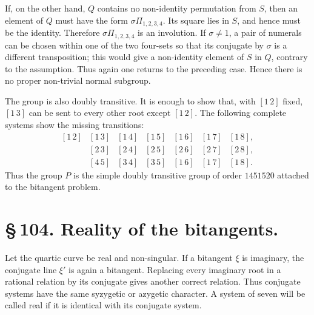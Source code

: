 \documentclass[11pt]{article}
\providecommand{\pair}[2]{[#1\,#2]}
\begin{document}
If, on the other hand, \(Q\) contains no non-identity permutation from \(S\), then an element of \(Q\) must have the form \(\sigma\Pi_{1,2,3,4}\). Its square lies in \(S\), and hence must be the identity. Therefore \(\sigma\Pi_{1,2,3,4}\) is an involution. If \(\sigma\ne1\), a pair of numerals can be chosen within one of the two four-sets so that its conjugate by \(\sigma\) is a different transposition; this would give a non-identity element of \(S\) in \(Q\), contrary to the assumption. Thus again one returns to the preceding case. Hence there is no proper non-trivial normal subgroup.

The group is also doubly transitive. It is enough to show that, with \(\pair{1}{2}\) fixed, \(\pair{1}{3}\) can be sent to every other root except \(\pair{1}{2}\). The following complete systems show the missing transitions:
\[
\begin{array}{lllllll}
\pair{1}{2}&\pair{1}{3}&\pair{1}{4}&\pair{1}{5}&\pair{1}{6}&\pair{1}{7}&\pair{1}{8},\\
\pair{1}{2}&\pair{2}{3}&\pair{2}{4}&\pair{2}{5}&\pair{2}{6}&\pair{2}{7}&\pair{2}{8},\\
\pair{1}{2}&\pair{4}{5}&\pair{3}{4}&\pair{3}{5}&\pair{1}{6}&\pair{1}{7}&\pair{1}{8}.
\end{array}
\]
Thus the group \(P\) is the simple doubly transitive group of order \(1451520\) attached to the bitangent problem.

\section*{\S\,104. Reality of the bitangents.}

Let the quartic curve be real and non-singular. If a bitangent \(\xi\) is imaginary, the conjugate line \(\xi'\) is again a bitangent. Replacing every imaginary root in a rational relation by its conjugate gives another correct relation. Thus conjugate systems have the same syzygetic or azygetic character. A system of seven will be called real if it is identical with its conjugate system.
\end{document}
